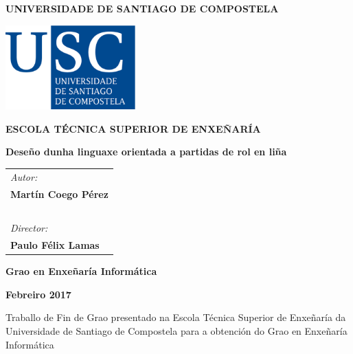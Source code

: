\pagestyle{empty}
\begin{center}
{\bf\Large UNIVERSIDADE DE SANTIAGO DE COMPOSTELA}

\vspace{0.5cm}
\includegraphics[width=5cm]{figuras/logo_usc.eps}

\vspace{0.5cm}
{\bf\large ESCOLA TÉCNICA SUPERIOR DE ENXEÑARÍA}

\vspace{2cm}
{\bf\LARGE Deseño dunha linguaxe orientada a partidas de rol en liña}

\end{center}

\vspace{2cm}
\hspace{4cm}\begin{tabular}{l}
{\it\Large Autor:} \\
{\bf\Large Martín Coego Pérez} \\
~ \\
{\it\Large Director:} \\
{\bf\Large Paulo Félix Lamas} \\
\end{tabular}

\vspace{2cm}
\begin{center}
{\bf\Large Grao en Enxeñaría Informática}

\vspace{0.5cm}
{\bf\large Febreiro 2017}

\vspace{0.5cm}
Traballo de Fin de Grao presentado na Escola Técnica Superior de Enxeñaría da
Universidade de Santiago de Compostela para a obtención do Grao en Enxeñaría
Informática
\end{center}

